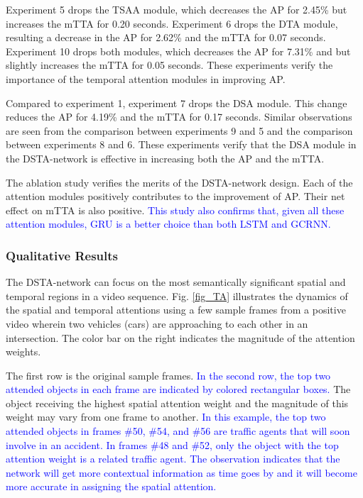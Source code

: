 \documentclass[journal]{IEEEtran}
\begin{document}
Experiment 5 drops the TSAA module, which decreases the AP for 2.45\% but increases the mTTA for 0.20 seconds. Experiment 6 drops the DTA module, resulting a decrease in the AP for 2.62\% and the mTTA for 0.07 seconds. Experiment 10 drops both modules, which decreases the AP for 7.31\% and but slightly increases the mTTA for 0.05 seconds. These experiments verify the importance of the temporal attention modules in improving AP. 



Compared to experiment 1, experiment 7 drops the DSA module. This change reduces the AP for 4.19\% and the mTTA for 0.17 seconds. Similar observations are seen from the comparison between experiments 9 and 5 and the comparison between experiments 8 and 6. These experiments verify that the DSA module in the DSTA-network is effective in increasing both the AP and the mTTA. 



The ablation study verifies the merits of the DSTA-network design. Each of the attention modules positively contributes to the improvement of AP. Their net effect on mTTA is also positive. \textcolor{blue}{This study also confirms that, given all these attention modules, GRU is a better choice than both LSTM and GCRNN.}

\subsubsection{Qualitative Results}
The DSTA-network can focus on the most semantically significant spatial and temporal regions in a video sequence. Fig. \ref{fig_TA} illustrates the dynamics of the spatial and temporal attentions using a few sample frames from a positive video wherein two vehicles (cars) are approaching to each other in an intersection. The color bar on the right indicates the magnitude of the attention weights. 

The first row is the original sample frames. \textcolor{blue}{In the second row, the top two attended objects in each frame are indicated by colored rectangular boxes.} The object receiving the highest spatial attention weight and the magnitude of this weight may vary from one frame to another. \textcolor{blue}{In this example, the top two attended objects in frames \#50, \#54, and \#56 are traffic agents that will soon involve in an accident. In frames \#48 and \#52, only the object with the top attention weight is a related traffic agent. The observation indicates that the network will get more contextual information as time goes by and it will become more accurate in assigning the spatial attention.}
 
\end{document}
